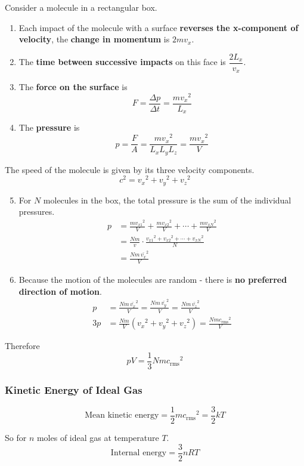 Consider a molecule in a rectangular box.

\begin{enumerate}
    \item Each impact of the molecule with a surface \textbf{reverses the x-component of velocity}, the \textbf{change in momentum} is $2mv_x$.
    \item The \textbf{time between successive impacts} on this face is $\dfrac{2L_x}{v_x}$.
    \item The \textbf{force on the surface} is
        $$F=\frac{\Delta p}{\Delta t}=\frac{m{v_x}^2}{L_x}$$
    \item The \textbf{pressure} is
        $$p=\frac{F}{A}=\frac{m{v_x}^2}{L_xL_yL_z}=\frac{m{v_x}^2}{V}$$
\end{enumerate}

The speed of the molecule is given by its three velocity components.
$$c^2={v_x}^2+{v_y}^2+{v_z}^2$$

\begin{enumerate}
    \setcounter{enumi}{4}
    \item For $N$ molecules in the box, the total pressure is the sum of the individual pressures.
        \begin{align*}
            p&=\frac{m{v_{x1}}^2}{V}+\frac{m{v_{x2}}^2}{V}+\cdots+\frac{m{v_{xN}}^2}{V}\\
             &=\frac{Nm}{v}\cdot\frac{{v_{x1}}^2+{v_{x2}}^2+\cdots+{v_{xN}}^2}{N}\\
             &=\frac{Nm\,\bar{v_x}^2}{V}
        \end{align*}
    \item Because the motion of the molecules are random - there is \textbf{no preferred direction of motion}.
        \begin{align*}
            p&=\frac{Nm\,\bar{v_x}^2}{V}=\frac{Nm\,\bar{v_y}^2}{V}=\frac{Nm\,\bar{v_z}^2}{V}\\
            3p&=\frac{Nm}{V}({v_x}^2+{v_y}^2+{v_z}^2)=\frac{Nm{c_\text{rms}}^2}{V}
        \end{align*}
\end{enumerate}

Therefore
$$pV=\frac{1}{3}Nm{c_\text{rms}}^2$$

\subsubsection*{Kinetic Energy of Ideal Gas}

$$\text{Mean kinetic energy}=\frac{1}{2}m{c_\text{rms}}^2=\frac{3}{2}kT$$

So for $n$ moles of ideal gas at temperature $T$.
$$\text{Internal energy}=\frac{3}{2}nRT$$
